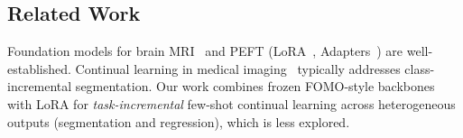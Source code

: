 \subsection{Related Work}
\label{sec:related}

Foundation models for brain MRI~\cite{fomo2025,unetr} and PEFT (LoRA~\cite{hu2022lora}, Adapters~\cite{houlsby2019}) are well-established. Continual learning in medical imaging~\cite{kirkpatrick2017,li2017lwf} typically addresses class-incremental segmentation. Our work combines frozen FOMO-style backbones with LoRA for \emph{task-incremental} few-shot continual learning across heterogeneous outputs (segmentation and regression), which is less explored.
